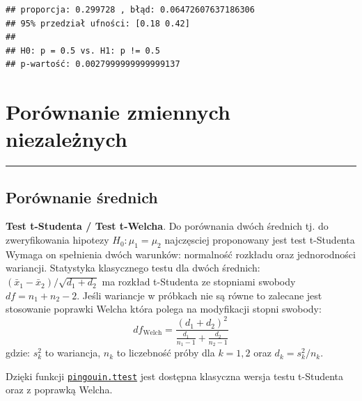 \documentclass[polish,]{book}
\newenvironment{Shaded}{\begin{snugshade}}{\end{snugshade}}
\newcommand{\BuiltInTok}[1]{#1}
\newcommand{\DecValTok}[1]{\textcolor[rgb]{0.00,0.00,0.81}{#1}}
\newcommand{\FloatTok}[1]{\textcolor[rgb]{0.00,0.00,0.81}{#1}}
\newcommand{\ImportTok}[1]{#1}
\newcommand{\NormalTok}[1]{#1}
\newcommand{\OperatorTok}[1]{\textcolor[rgb]{0.81,0.36,0.00}{\textbf{#1}}}
\newcommand{\StringTok}[1]{\textcolor[rgb]{0.31,0.60,0.02}{#1}}
\newcommand{\VariableTok}[1]{\textcolor[rgb]{0.00,0.00,0.00}{#1}}
\begin{document}
\begin{verbatim}
## proporcja: 0.299728 , błąd: 0.06472607637186306 
## 95% przedział ufności: [0.18 0.42]
## 
## H0: p = 0.5 vs. H1: p != 0.5 
## p-wartość: 0.0027999999999999137
\end{verbatim}

\hypertarget{R8}{%
\chapter{Porównanie zmiennych niezależnych}\label{R8}}

\begin{center}\rule{0.5\linewidth}{\linethickness}\end{center}

\hypertarget{R81}{%
\section{Porównanie średnich}\label{R81}}

\textbf{Test t-Studenta / Test t-Welcha}. Do porównania dwóch średnich tj. do zweryfikowania hipotezy \(H_0:\mu_1=\mu_2\) najczęsciej proponowany jest test t-Studenta Wymaga on spełnienia dwóch warunków: normalność rozkładu oraz jednorodności wariancji. Statystyka klasycznego testu dla dwóch średnich: \((\bar{x}_1-\bar{x}_2)/\sqrt{d_1+d_2}\) ma rozkład t-Studenta ze stopniami swobody \(df=n_1+n_2-2\).
Jeśli wariancje w próbkach nie są równe to zalecane jest stosowanie poprawki Welcha \citep{welch2016} która polega na modyfikacji stopni swobody:
\begin{equation}
df_{\mathrm{Welch}}=\frac{(d_1+d_2)^2}{\frac{d_1}{n_1-1}+\frac{d_2}{n_2-1}}
\label{eq:df01}
\end{equation}
gdzie: \(s_k^2\) to wariancja, \(n_k\) to liczebność próby dla \(k=1,2\) oraz \(d_k=s^2_k/n_k\).

Dzięki funkcji \href{https://pingouin-stats.org/generated/pingouin.ttest.html\#pingouin.ttest}{\texttt{pingouin.ttest}} jest dostępna klasyczna wersja testu t-Studenta oraz z poprawką Welcha.

\begin{Shaded}
\end{Shaded}
\end{document}
